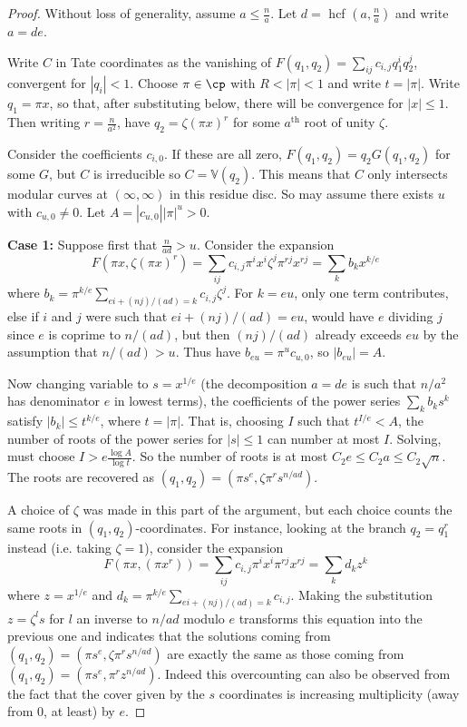 \documentclass[12pt,letterpaper]{article}
\begin{document}
	
	\begin{proof}
		Without loss of generality, assume $a\leq\frac{n}{a}$. Let $d =$ hcf $(a,\frac{n}{a})$ and write $a=de$.
		
		Write $C$ in Tate coordinates as the vanishing of $F(q_1,q_2) = \sum_{ij} c_{i,j}q_1^iq_2^j$, convergent for $|q_i|<1$. Choose $\pi \in \cp$ with $R<|\pi|<1$ and write $t=|\pi|$. Write $q_1 = \pi x$, so that, after substituting below, there will be convergence for $|x|\leq 1$. Then writing $r = \frac{n}{a^2}$, have $q_2 = \zeta (\pi x)^r$ for some $a^\text{th}$ root of unity $\zeta$.
		
		
		Consider the coefficients $c_{i,0}$. If these are all zero, $F(q_1,q_2) = q_2G(q_1,q_2)$ for some $G$, but $C$ is irreducible so $C = \mathbb{V}(q_2)$. This means that $C$ only intersects modular curves at $(\infty,\infty)$ in this residue disc. So may assume there exists $u$ with $c_{u,0}\ne 0$. Let $A = |c_{u,0}||\pi|^u>0$.
		
		\textbf{Case 1:} Suppose first that $\frac{n}{ad}>u$. Consider the expansion
		\[F(\pi x,\zeta(\pi x)^r) = \sum_{ij} c_{i,j}\pi^ix^i\zeta^j\pi^{rj}x^{rj} = \sum_k b_k x^{k/e}\] where $b_k = \pi^{k/e}\sum_{ei+(nj)/(ad)=k} c_{i,j}\zeta^j$. For $k=eu$, only one term contributes, else if $i$ and $j$ were such that $ei+(nj)/(ad) = eu$, would have $e$ dividing $j$ since $e$ is coprime to $n/(ad)$, but then $(nj)/(ad)$ already exceeds $eu$ by the assumption that $n/(ad)>u$. Thus have $b_{eu} = \pi^uc_{u,0}$, so $|b_{eu}|=A$.
		
		Now changing variable to $s = x^{1/e}$ (the decomposition $a=de$ is such that $n/a^2$ has denominator $e$ in lowest terms), the coefficients of the power series $\sum_k b_ks^k$ satisfy $|b_k|\leq t^{k/e}$, where $t=|\pi|$. That is, choosing $I$ such that $t^{I/e}<A$, the number of roots of the power series for $|s|\leq 1$ can number at most $I$. Solving, must choose $I>e\frac{\log{A}}{\log{t}}$. So the number of roots is at most $C_2e \leq C_2a \leq C_2\sqrt{n}$. The roots are recovered as $(q_1,q_2) = (\pi s^e, \zeta\pi^rs^{n/ad})$.
		
		A choice of $\zeta$ was made in this part of the argument, but each choice counts the same roots in $(q_1,q_2)$-coordinates. For instance, looking at the branch $q_2 = q_1^r$ instead (i.e. taking $\zeta=1$), consider the expansion		
		\[F(\pi x, (\pi x^r))=  \sum_{ij} c_{i,j}\pi^ix^i\pi^{rj}x^{rj} = \sum_k d_k z^k\] where $z = x^{1/e}$ and $d_k = \pi^{k/e}\sum_{ei+(nj)/(ad)=k} c_{i,j}$. Making the substitution $z=\zeta^ls$ for $l$ an inverse to $n/ad$ modulo $e$ transforms this equation into the previous one and indicates that the solutions coming from $(q_1,q_2) = (\pi s^e, \zeta\pi^rs^{n/ad})$ are exactly the same as those coming from $(q_1,q_2) = (\pi s^e, \pi^rz^{n/ad})$. Indeed this overcounting can also be observed from the fact that the cover given by the $s$ coordinates is increasing multiplicity (away from 0, at least) by $e$.
		

\end{proof}
\end{document}
